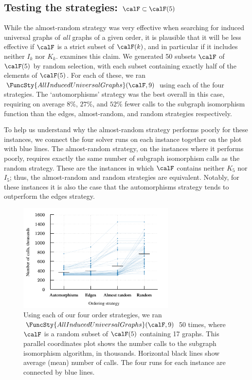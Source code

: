 

\subsection{Testing the strategies: $\calF \subset \calF(5)$}

While the almost-random strategy was very effective when searching
for induced universal graphs of \emph{all} graphs of a given order,
it is plausible that it will be less effective if $\calF$ is a strict
subset of $\calF(k)$, and in particular if it includes
neither $I_k$ nor $K_k$.  
examines this claim.  We generated 50 subsets $\calF$ of $\calF(5)$ by random selection,
with each subset containing exactly half of the elements of $\calF(5)$.
For each of these, we ran $\FuncSty{AllInducedUniversalGraphs}(\calF,9)$
using each of the four strategies.  The `automorphisms' strategy
was the best overall in this case, requiring on average $8\%$, $27\%$, and $52\%$
fewer calls to the subgraph isomorphism function than the edges, almost-random,
and random strategies respectively.

To help us understand why the almost-random
strategy performs poorly for these instances, we connect the four solver runs on
each instance together on the plot with blue lines.  The almost-random
strategy, on the instances where it performs poorly, requires
exactly the same number of subgraph isomorphism calls as the random strategy.
These are the instances in which $\calF$ contains neither $K_5$ nor $I_5$;
thus, the almost-random and random strategies are equivalent.  Notably,
for these instances it is also the case that the automorphisms strategy
tends to outperform the edges strategy.

\begin{figure}[htb]
    \centering

    \includegraphics*[width=0.7\textwidth]{15-universal-graphs/img/second-experiment-plot-using-sample}

    \caption{Using each of our four order strategies, we ran
        $\FuncSty{AllInducedUniversalGraphs}(\calF,9)$ 50 times, where
        $\calF$ is a random subset of $\calF(5)$ containing 17 graphs. This
        parallel coordinates plot
        shows the number calls to the subgraph isomorphism algorithm, in thousands.
        Horizontal black lines show average (mean) number of calls.  The four runs for
        each instance are connected by blue lines.}
\label{fig:second-experiment-using-sample}
\end{figure}

